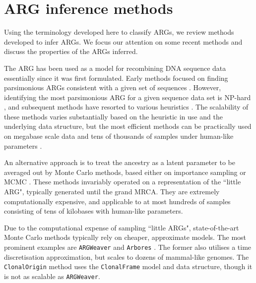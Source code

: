 \documentclass{article}
\begin{document}
\section*{ARG inference methods}
Using the terminology developed here to classify ARGs, we review methods developed
to infer ARGs. We focus our attention on some recent methods and discuss the
properties of the ARGs inferred.

The ARG has been used as a model for recombining DNA sequence data essentially
since it was first formulated. Early methods focused on finding parsimonious
ARGs consistent with a given set of
sequences \citep{hein1990reconstructing, lyngso2005minimum}.
However, identifying the most parsimonious ARG for a given sequence data set
is NP-hard \citep{wang2001perfect}, and subsequent methods have resorted to
various heuristics \citep{fallon2013acg, hein1993heuristic, ignatieva2021kwarg, 
kelleher2019inferring, minichiello2006mapping, mirzaei2017rent,
parida2008estimating, song2005efficient, thao2019hybrid, zhang2021biobank}. 
The scalability of these methods varies substantially based on the heuristic in use
and the underlying data structure, but the most efficient methods can be practically
used on megabase scale data and tens of thousands of samples under human-like
parameters \citep{kelleher2019inferring, zhang2021biobank}.

An alternative approach is to treat the ancestry as a latent parameter to be averaged out
by Monte Carlo methods, based either on importance sampling 
\citep{griffiths1996ancestral, fearnhead2001estimating, jenkins2011inference} 
or MCMC \citep{kuhner2000maximum, nielsen2000estimation, wang2008bayesian}.
These methods invariably operated on a representation of the ``little ARG", typically
generated until the grand MRCA. They are extremely computationally expensive,
and applicable to at most hundreds of samples consisting of tens of kilobases with
human-like parameters.

Due to the computational expense of sampling ``little ARGs", state-of-the-art
Monte Carlo methods typically rely on cheaper, approximate models.
The most prominent examples are \texttt{ARGWeaver} \citep{rasmussen2014genome}
and \texttt{Arbores} \citep{heine2018bridging}. The former also utilises a time
discretisation approximation, but scales to dozens of mammal-like genomes.
The \texttt{ClonalOrigin} method \citep{didelot2010inference,
medinaaguayo2020speeding} uses the \texttt{ClonalFrame}
model and data structure, though it is not as scalable as \texttt{ARGWeaver}.
\end{document}
